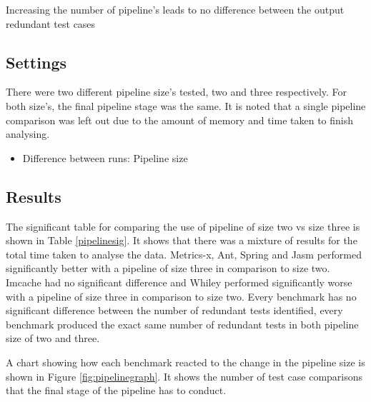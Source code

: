 \begin{hyp}
Increasing the number of pipeline's leads to no difference between the output redundant test cases
\end{hyp}

\subsection{Settings}
There were two different pipeline size's tested, two and three respectively. For both size's, the final pipeline stage was the same. It is noted that a single pipeline comparison was left out due to the amount of memory and time taken to finish analysing.

\begin{itemize}
\item Difference between runs: Pipeline size
\end{itemize}

\subsection{Results}

The significant table for comparing the use of pipeline of size two vs size three is shown in Table \ref{pipelinesig}. It shows that there was a mixture of results for the total time taken to analyse the data. Metrics-x, Ant, Spring and Jasm performed significantly better with a pipeline of size three in comparison to size two. Imcache had no significant difference and Whiley performed significantly worse with a pipeline of size three in comparison to size two. Every benchmark has no significant difference between the number of redundant tests identified, every benchmark produced the exact same number of redundant tests in both pipeline size of two and three.

A chart showing how each benchmark reacted to the change in the pipeline size is shown in Figure \ref{fig:pipelinegraph}. It shows the number of test case comparisons that the final stage of the pipeline has to conduct.

